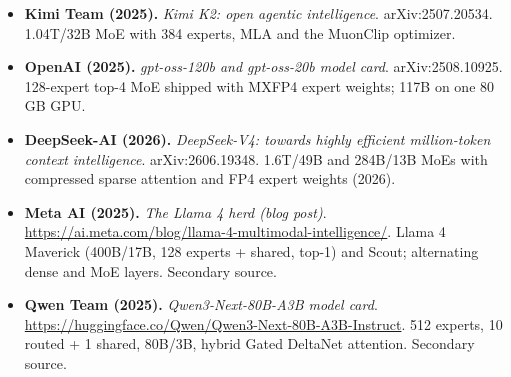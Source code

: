 \documentclass[11pt,letterpaper]{article}
\begin{document}
\begin{itemize}[leftmargin=1.2em,itemsep=3pt]
\item \textbf{Kimi Team (2025).} \textit{Kimi K2: open agentic intelligence}. arXiv:2507.20534. 1.04T/32B MoE with 384 experts, MLA and the MuonClip optimizer.
\item \textbf{OpenAI (2025).} \textit{gpt-oss-120b and gpt-oss-20b model card}. arXiv:2508.10925. 128-expert top-4 MoE shipped with MXFP4 expert weights; 117B on one 80 GB GPU.
\item \textbf{DeepSeek-AI (2026).} \textit{DeepSeek-V4: towards highly efficient million-token context intelligence}. arXiv:2606.19348. 1.6T/49B and 284B/13B MoEs with compressed sparse attention and FP4 expert weights (2026).
\item \textbf{Meta AI (2025).} \textit{The Llama 4 herd (blog post)}. \url{https://ai.meta.com/blog/llama-4-multimodal-intelligence/}. Llama 4 Maverick (400B/17B, 128 experts + shared, top-1) and Scout; alternating dense and MoE layers. Secondary source.
\item \textbf{Qwen Team (2025).} \textit{Qwen3-Next-80B-A3B model card}. \url{https://huggingface.co/Qwen/Qwen3-Next-80B-A3B-Instruct}. 512 experts, 10 routed + 1 shared, 80B/3B, hybrid Gated DeltaNet attention. Secondary source.
\end{itemize}
\end{document}
